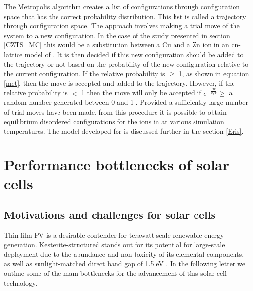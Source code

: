 \documentclass[11pt, twoside]{report}
\begin{document}
The Metropolis algorithm creates a list of configurations through configuration space that has the correct probability distribution. This list is called a trajectory through configuration space. The approach involves making a trial move of the system to a new configuration. In the case of the study presented in section \ref{CZTS_MC} this would be a substitution between a Cu and a Zn ion in an on-lattice model of {\CZTS}. It is then decided if this new configuration should be added to the trajectory or not based on the probability of the new configuration relative to the current configuration. If the relative probability is  $\geq$ 1, as shown in equation \ref{met}, then the move is accepted and added to the trajectory. However, if the relative probability is $<$ 1 then the move will only be accepted if $e^{-\frac{\Delta E}{k_BT}} \ge$ a random number generated between 0 and 1 \cite{Lesar3}. Provided a sufficiently large number of trial moves have been made, from this procedure it is possible to obtain equilibrium disordered configurations for the ions in {\CZTS} at various simulation temperatures. The model developed for {\CZTS} is discussed further in the section \ref{Eris}.


 








\chapter{Performance bottlenecks of {\CZTS} solar cells}\label{chap:CZTS}
\section{Motivations and challenges for {\CZTS} solar cells}
Thin-film PV is a desirable contender for terawatt-scale renewable energy generation. Kesterite-structured {\CZTS} stands out for its potential for large-scale deployment due to the abundance and non-toxicity of its elemental components, as well as sunlight-matched direct band gap of 1.5 eV \cite{CZTS_rev}. In the following letter we outline some of the main bottlenecks for the advancement of this solar cell technology.


\end{document}

